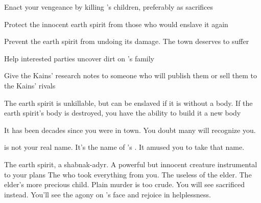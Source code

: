 \documentclass[char]{Pestilence}
\begin{document}
\begin{itemz}[Goals]
	\item Enact your vengeance by killing \cElder{}'s children, preferably as sacrifices
	\item Protect the innocent earth spirit from those who would enslave it again
	\item Prevent the earth spirit from undoing its damage. The town deserves to suffer
	\item Help interested parties uncover dirt on \cElder{}'s family
	\item Give the Kains' research notes to someone who will publish them or sell them to the Kains' rivals

\end{itemz}

\begin{itemz}[Notes]
	\item The earth spirit is unkillable, but can be enslaved if it is without a body. If the earth spirit's body is destroyed, you have the ability to build it a new body
	\item It has been decades since you were in town. You doubt many will recognize you.
	\item \cShaman{} is not your real name. It's the name of \cElder{\intro}'s \cElderSpouse{\spouse}. It amused you to take that name.
\end{itemz}

\begin{contacts}
	\contact{\cPlaguebearer{}} The earth spirit, a shabnak-adyr. A powerful but innocent creature instrumental to your plans
	\contact{\cElder{}} The \cElder{\human} who took everything from you. 
	\contact{\cApprentice{}} The useless \cApprentice{\offspring} of the elder.
	\contact{\cRebel{}} The elder's more precious child. Plain murder is too crude. You will see \cRebel{\them} sacrificed instead. You'll see the agony on \cElder{}'s face and rejoice in \cElder{\their} helplessness.
\end{contacts}
\end{document}
